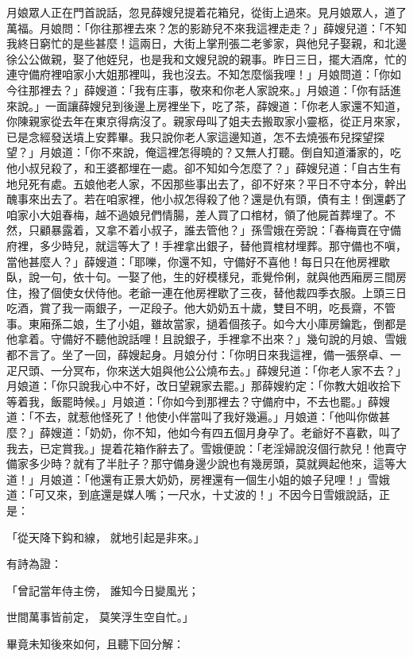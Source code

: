 \begin{showcontents}{}
月娘眾人正在門首說話，忽見薛嫂兒提着花箱兒，從街上過來。見月娘眾人，道了萬福。月娘問：「你往那裡去來？怎的影跡兒不來我這裡走走？」薛嫂兒道：「不知我終日窮忙的是些甚麼！這兩日，大街上掌刑張二老爹家，與他兒子娶親，和北邊徐公公做親，娶了他姪兒，也是我和文嫂兒說的親事。昨日三日，擺大酒席，忙的連守備府裡咱家小大姐那裡叫，我也沒去。不知怎麼惱我哩！」月娘問道：「你如今往那裡去？」薛嫂道：「我有庄事，敬來和你老人家說來。」月娘道：「你有話進來說。」一面讓薛嫂兒到後邊上房裡坐下，吃了茶，薛嫂道：「你老人家還不知道，你陳親家從去年在東京得病沒了。親家母叫了姐夫去搬取家小靈柩，從正月來家，已是念經發送墳上安葬畢。我只說你老人家這邊知道，怎不去燒張布兒探望探望？」月娘道：「你不來說，俺這裡怎得曉的？又無人打聽。倒自知道潘家的，吃他小叔兒殺了，和王婆都埋在一處。卻不知如今怎麼了？」薛嫂兒道：「自古生有地兒死有處。五娘他老人家，不因那些事出去了，卻不好來？平日不守本分，幹出醜事來出去了。若在咱家裡，他小叔怎得殺了他？還是仇有頭，債有主！倒還虧了咱家小大姐春梅，越不過娘兒們情腸，差人買了口棺材，領了他屍首葬埋了。不然，只顧暴露着，又拿不着小叔子，誰去管他？」孫雪娥在旁說：「春梅賣在守備府裡，多少時兒，就這等大了！手裡拿出銀子，替他買棺材埋葬。那守備也不嗔，當他甚麼人？」薛嫂道：「耶嚛，你還不知，守備好不喜他！每日只在他房裡歇臥，說一句，依十句。一娶了他，生的好模樣兒，乖覺伶俐，就與他西廂房三間房住，撥了個使女伏侍他。老爺一連在他房裡歇了三夜，替他裁四季衣服。上頭三日吃酒，賞了我一兩銀子，一疋段子。他大奶奶五十歲，雙目不明，吃長齋，不管事。東廂孫二娘，生了小姐，雖故當家，撾着個孩子。如今大小庫房鑰匙，倒都是他拿着。守備好不聽他說話哩！且說銀子，手裡拿不出來？」幾句說的月娘、雪娥都不言了。坐了一回，薛嫂起身。月娘分付：「你明日來我這裡，備一張祭卓、一疋尺頭、一分冥布，你來送大姐與他公公燒布去。」薛嫂兒道：「你老人家不去？」月娘道：「你只說我心中不好，改日望親家去罷。」那薛嫂約定：「你教大姐收拾下等着我，飯罷時候。」月娘道：「你如今到那裡去？守備府中，不去也罷。」薛嫂道：「不去，就惹他怪死了！他使小伴當叫了我好幾遍。」月娘道：「他叫你做甚麼？」薛嫂道：「奶奶，你不知，他如今有四五個月身孕了。老爺好不喜歡，叫了我去，已定賞我。」提着花箱作辭去了。雪娥便說：「老淫婦說沒個行款兒！他賣守備家多少時？就有了半肚子？那守備身邊少說也有幾房頭，莫就興起他來，這等大道！」月娘道：「他還有正景大奶奶，房裡還有一個生小姐的娘子兒哩！」雪娥道：「可又來，到底還是媒人嘴；一尺水，十丈波的！」不因今日雪娥說話，正是：

「從天降下鈎和線，  就地引起是非來。」

有詩為證：

「曾記當年侍主傍，  誰知今日變風光；

世間萬事皆前定，  莫笑浮生空自忙。」

畢竟未知後來如何，且聽下回分解：





\end{showcontents}


